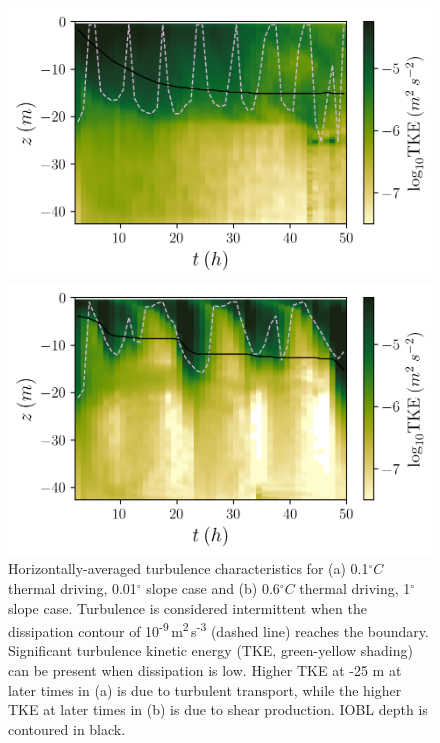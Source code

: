 \documentclass[draft]{styles/agujournal2019}
\begin{document}
\begin{figure}[h!]
    \centering
    \begin{minipage}{0.5\textwidth}
        \includegraphics[trim={0 0cm 0cm 0cm},clip,width=\textwidth]{Figures/dslope2/e_hovmoller.png}
    \end{minipage}%
    \begin{minipage}{0.5\textwidth}
        \includegraphics[trim={0 0cm 0 0cm},clip,width=\textwidth]{Figures/dT4/e_hovmoller.png}
    \end{minipage}
    \caption{Horizontally-averaged turbulence characteristics for (a) 0.1$^{\circ}C$ thermal driving, 0.01$^{\circ}$ slope case and (b) 0.6$^{\circ}C$ thermal driving, 1$^{\circ}$ slope case. Turbulence is considered intermittent when the dissipation contour of 10\textsuperscript{-9}\,m\textsuperscript{2}\,s\textsuperscript{-3} (dashed line) reaches the boundary. Significant turbulence kinetic energy (TKE, green-yellow shading) can be present when dissipation is low. Higher TKE at -25 m at later times in (a) is due to turbulent transport, while the higher TKE at later times in (b) is due to shear production. IOBL depth is contoured in black. }
    \label{fig:intermittency}
\end{figure}
\end{document}
